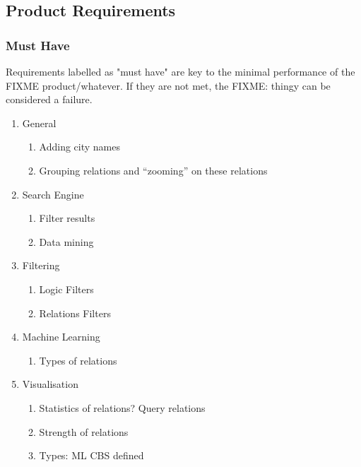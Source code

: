 \subsection{Product Requirements}\label{sec:reqs}
\subsubsection {Must Have}
Requirements labelled as "must have" are key to the minimal performance of the {\color{red} FIXME product/whatever}. If they are not met, the {\color{red} FIXME: thingy} can be considered a failure.

\begin{enumerate}
    \item{General} 
    \begin{enumerate}
        \item Adding city names
        \item Grouping relations and “zooming” on these relations
    \end{enumerate}
    
    \item{Search Engine} 
    \begin{enumerate}
        \item Filter results
        \item Data mining
    \end{enumerate}
    
    \item{Filtering} 
    \begin{enumerate}
        \item Logic Filters 
        \item Relations Filters
    \end{enumerate}
    
    \item{Machine Learning} 
    \begin{enumerate}
        \item Types of relations
    \end{enumerate}
    
    \item{Visualisation}
    \begin{enumerate}
        \item Statistics of relations? Query relations
        \item Strength of relations
        \item Types: ML CBS defined
    \end{enumerate}
\end{enumerate}


